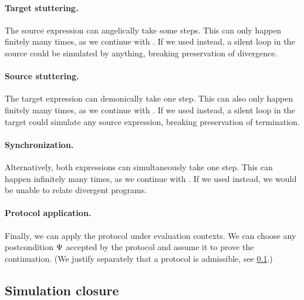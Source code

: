 \paragraph{ Target stuttering.}
The source expression can angelically take some steps.
This can only happen finitely many times, as we continue with \iSimLfp.
If we used \iSimGfp instead, a silent loop in the source could be simulated by anything, breaking preservation of divergence.

\paragraph{ Source stuttering.}
The target expression can demonically take one step.
This can also only happen finitely many times, as we continue with \iSimLfp.
If we used \iSimGfp instead, a silent loop in the target could simulate any source expression, breaking preservation of termination.

\paragraph{ Synchronization.}
Alternatively, both expressions can simultaneously take one step.
This can happen infinitely many times, as we continue with \iSimGfp.
If we used \iSimLfp instead, we would be unable to relate divergent programs.

\paragraph{ Protocol application.}
Finally, we can apply the protocol under evaluation contexts.
We can choose any postcondition $\Psi$ accepted by the protocol and assume it to prove the continuation.
(We justify separately that a protocol is admissible, see \cref{subsec:closure}.)

\subsection{Simulation closure}\label{subsec:closure}

